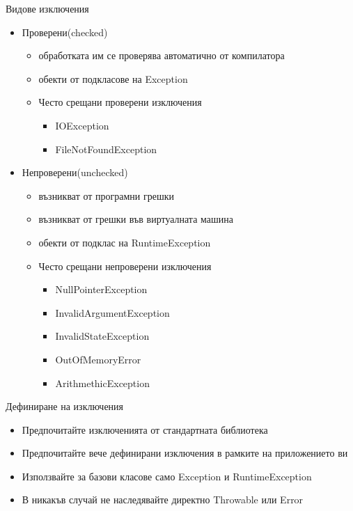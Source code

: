 \documentclass{beamer}
\begin{document}
\begin{frame}{Видове изключения}
  \transdissolve
  \begin{itemize}
  \item Проверени(checked)
    \begin{itemize}
      \item обработката им се проверява автоматично от компилатора
      \item обекти от подкласове на Exception
      \item Често срещани проверени изключения
        \begin{itemize}
          \item IOException
          \item FileNotFoundException
        \end{itemize}

    \end{itemize}

  \item Непроверени(unchecked)
    \begin{itemize}
      \item възникват от програмни грешки
      \item възникват от грешки във виртуалната машина
      \item обекти от подклас на RuntimeException
      \item Често срещани непроверени изключения
        \begin{itemize}
          \item NullPointerException
          \item InvalidArgumentException
          \item InvalidStateException
          \item OutOfMemoryError
          \item ArithmethicException
        \end{itemize}

    \end{itemize}

  \end{itemize}
\end{frame}

\begin{frame}{Дефиниране на изключения}
  \transdissolve
  \begin{itemize}
  \item Предпочитайте изключенията от стандартната библиотека
  \item Предпочитайте вече дефинирани изключения в рамките на
    приложението ви
  \item Използвайте за базови класове само Exception и
    RuntimeException
  \item В никакъв случай не наследявайте директно Throwable или Error
  \end{itemize}
\end{frame}
\end{document}
